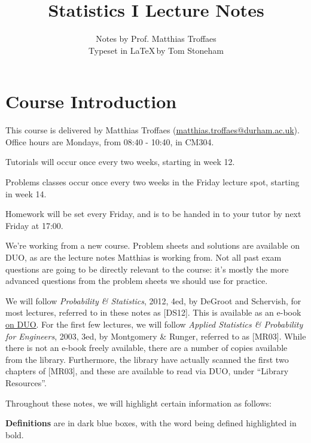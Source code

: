 \documentclass[a4paper]{article}
\title{\vspace{-2cm}Statistics I Lecture Notes}
\author{Notes by Prof. Matthias Troffaes \\ Typeset in \LaTeX \,by Tom Stoneham}
\date{}
\begin{document}
    \maketitle

    \tableofcontents

    \newpage
    \setcounter{section}{-1}
    \section{Course Introduction}
        This course is delivered by Matthias Troffaes
        (\href{mailto:matthias.troffaes@durham.ac.uk}
        {\underline{matthias.troffaes@durham.ac.uk}}). Office hours are Mondays,
        from 08:40 - 10:40, in CM304.

        Tutorials will occur once every two weeks, starting in week 12.

        Problems classes occur once every two weeks in the Friday lecture spot,
        starting in week 14.

        Homework will be set every Friday, and is to be handed in to your tutor
        by next Friday at 17:00.

        We're working from a new course. Problem sheets and solutions are
        available on DUO, as are the lecture notes Matthias is working from. Not
        all past exam questions are going to be directly relevant to the course:
        it's mostly the more advanced questions from the problem sheets we
        should use for practice.

        We will follow \textit{Probability \& Statistics}, 2012, 4ed, by DeGroot
        and Schervish, for most lectures, referred to in these notes as [DS12].
        This is available as an e-book
        \href{http://library.dur.ac.uk/record=b2868012~S1}{\underline{on DUO}}.
        For the first few lectures, we will follow \textit{Applied Statistics \&
        Probability for Engineers}, 2003, 3ed, by Montgomery \& Runger, referred
        to as [MR03]. While there is not an e-book freely available, there are a
        number of copies available from the library. Furthermore, the library
        have actually scanned the first two chapters of [MR03], and these are
        available to read via DUO, under ``Library Resources''.

        Throughout these notes, we will highlight certain information as
        follows:

        \begin{definition}[Introduction]
            \textbf{Definitions} are in dark blue boxes, with the word being
            defined highlighted in bold.
        \end{definition}
\end{document}

